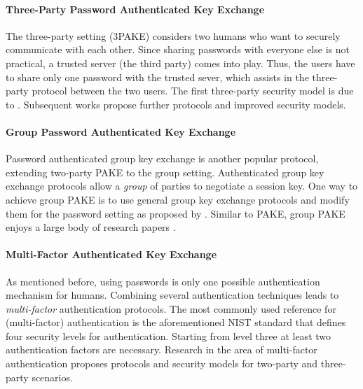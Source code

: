 \paragraph{Three-Party Password Authenticated Key Exchange}
The three-party setting (3\ac{PAKE}) considers two humans who want to securely communicate with each other.
Since sharing passwords with everyone else is not practical, a trusted server (the third party) comes into play.
Thus, the users have to share only one password with the trusted sever, which assists in the three-party protocol between the two users.
The first three-party security model is due to \citet{Abdalla2005}.
Subsequent works \cite{CliffTB06,Yoneyama08,TsaiC13} propose further protocols and improved security models.

\paragraph{Group Password Authenticated Key Exchange}
Password authenticated group key exchange is another popular protocol, extending two-party \ac{PAKE} to the group setting.
Authenticated group key exchange protocols allow a \emph{group} of parties to negotiate a session key.
One way to achieve group \ac{PAKE} is to use general group key exchange protocols and modify them for the password setting as proposed by \citet{Bresson02,BrChPo05}.
Similar to \ac{PAKE}, group \ac{PAKE} enjoys a large body of research papers \cite{Kim2004,Abdalla2006,Bohli2006,Dutta2006,AbdallaP06,AbdallaBVS07,AbdallaCCP09,AbdallaCGP11,hao2015fairy}.

\paragraph{Multi-Factor Authenticated Key Exchange}
As mentioned before, using passwords is only one possible authentication mechanism for humans.
Combining several authentication techniques leads to \emph{multi-factor} authentication protocols.
The most commonly used reference for (multi-factor) authentication is the aforementioned \ac{NIST} standard \cite{Burr11} that defines four security levels for authentication.
Starting from level three at least two authentication factors are necessary.
Research in the area of multi-factor authentication \cite{PointchevalZ08,SUC10,LiuWM10,HaoC12} proposes protocols and security models for two-party and three-party scenarios.

